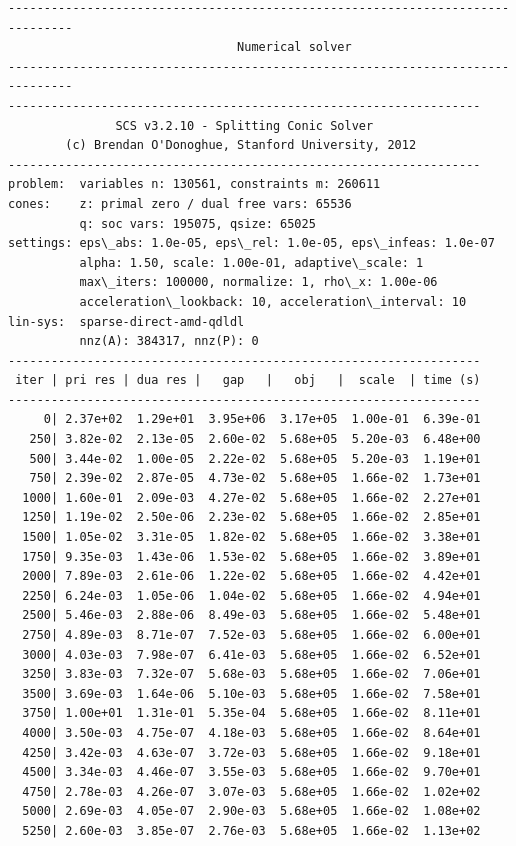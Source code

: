 \documentclass[11pt]{article}
\begin{document}
    \begin{Verbatim}[commandchars=\\\{\}]
-------------------------------------------------------------------------------
                                Numerical solver
-------------------------------------------------------------------------------
------------------------------------------------------------------
               SCS v3.2.10 - Splitting Conic Solver
        (c) Brendan O'Donoghue, Stanford University, 2012
------------------------------------------------------------------
problem:  variables n: 130561, constraints m: 260611
cones:    z: primal zero / dual free vars: 65536
          q: soc vars: 195075, qsize: 65025
settings: eps\_abs: 1.0e-05, eps\_rel: 1.0e-05, eps\_infeas: 1.0e-07
          alpha: 1.50, scale: 1.00e-01, adaptive\_scale: 1
          max\_iters: 100000, normalize: 1, rho\_x: 1.00e-06
          acceleration\_lookback: 10, acceleration\_interval: 10
lin-sys:  sparse-direct-amd-qdldl
          nnz(A): 384317, nnz(P): 0
------------------------------------------------------------------
 iter | pri res | dua res |   gap   |   obj   |  scale  | time (s)
------------------------------------------------------------------
     0| 2.37e+02  1.29e+01  3.95e+06  3.17e+05  1.00e-01  6.39e-01
   250| 3.82e-02  2.13e-05  2.60e-02  5.68e+05  5.20e-03  6.48e+00
   500| 3.44e-02  1.00e-05  2.22e-02  5.68e+05  5.20e-03  1.19e+01
   750| 2.39e-02  2.87e-05  4.73e-02  5.68e+05  1.66e-02  1.73e+01
  1000| 1.60e-01  2.09e-03  4.27e-02  5.68e+05  1.66e-02  2.27e+01
  1250| 1.19e-02  2.50e-06  2.23e-02  5.68e+05  1.66e-02  2.85e+01
  1500| 1.05e-02  3.31e-05  1.82e-02  5.68e+05  1.66e-02  3.38e+01
  1750| 9.35e-03  1.43e-06  1.53e-02  5.68e+05  1.66e-02  3.89e+01
  2000| 7.89e-03  2.61e-06  1.22e-02  5.68e+05  1.66e-02  4.42e+01
  2250| 6.24e-03  1.05e-06  1.04e-02  5.68e+05  1.66e-02  4.94e+01
  2500| 5.46e-03  2.88e-06  8.49e-03  5.68e+05  1.66e-02  5.48e+01
  2750| 4.89e-03  8.71e-07  7.52e-03  5.68e+05  1.66e-02  6.00e+01
  3000| 4.03e-03  7.98e-07  6.41e-03  5.68e+05  1.66e-02  6.52e+01
  3250| 3.83e-03  7.32e-07  5.68e-03  5.68e+05  1.66e-02  7.06e+01
  3500| 3.69e-03  1.64e-06  5.10e-03  5.68e+05  1.66e-02  7.58e+01
  3750| 1.00e+01  1.31e-01  5.35e-04  5.68e+05  1.66e-02  8.11e+01
  4000| 3.50e-03  4.75e-07  4.18e-03  5.68e+05  1.66e-02  8.64e+01
  4250| 3.42e-03  4.63e-07  3.72e-03  5.68e+05  1.66e-02  9.18e+01
  4500| 3.34e-03  4.46e-07  3.55e-03  5.68e+05  1.66e-02  9.70e+01
  4750| 2.78e-03  4.26e-07  3.07e-03  5.68e+05  1.66e-02  1.02e+02
  5000| 2.69e-03  4.05e-07  2.90e-03  5.68e+05  1.66e-02  1.08e+02
  5250| 2.60e-03  3.85e-07  2.76e-03  5.68e+05  1.66e-02  1.13e+02
    \end{Verbatim}
\end{document}
